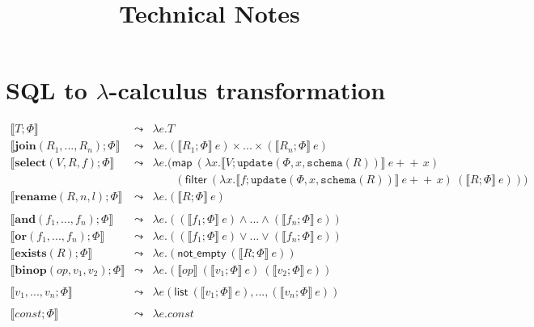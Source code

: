 \documentclass{article}
\newcommand{\concat}{\ensuremath{\!+\!\!\!\!+\!\,}}
\begin{document}
\title{Technical Notes}
\author{}
\date{}
\maketitle

\section*{SQL to $\lambda$-calculus transformation}


\[
\begin{array}{rcl}
 \llbracket T; \Phi  \rrbracket& \leadsto& \lambda e.T\\
\llbracket \mathbf{join}(R_1,...,R_n);\Phi \rrbracket &\leadsto& \lambda e.(\llbracket R_1; \Phi\rrbracket~e)\times...\times(\llbracket R_n;\Phi\rrbracket~e)\\
\llbracket \mathbf{select}(V, R, f);\Phi \rrbracket &\leadsto& \lambda e. (\mathsf{map}~(\lambda x.\llbracket V;\mathtt{update}(\Phi, x, \mathtt{schema}(R)) \rrbracket~ e\concat x)\\
& & \qquad(\mathsf{filter}~(\lambda x.\llbracket f; \mathtt{update}(\Phi, x,\mathtt{schema}(R))\rrbracket~e\concat x)~ (\llbracket R;\Phi \rrbracket~e)))\\
\llbracket \mathbf{rename}(R, n, l);\Phi \rrbracket &\leadsto& \lambda e.(\llbracket R; \Phi\rrbracket~e)\\
\\
 \llbracket \mathbf{and}(f_1,...,f_n);\Phi \rrbracket &\leadsto& \lambda e.((\llbracket f_1;\Phi \rrbracket~e) \land ... \land (\llbracket f_n;\Phi \rrbracket~e))\\
\llbracket \mathbf{or}(f_1,...,f_n);\Phi \rrbracket &\leadsto& \lambda e.((\llbracket f_1;\Phi \rrbracket~e) \lor ... \lor (\llbracket f_n;\Phi \rrbracket~e))\\
\llbracket\mathbf{exists}(R);\Phi \rrbracket &\leadsto& \lambda e. (\mathsf{not\_empty}~(\llbracket R;\Phi \rrbracket~e))\\
\llbracket \mathbf{binop}(\mathit{op}, v_1, v_2);\Phi\rrbracket &\leadsto&  \lambda e.(\llbracket \mathit{op} \rrbracket~(\llbracket v_1;\Phi \rrbracket~e)~(\llbracket v_2;\Phi \rrbracket~e))\\
\\
 \llbracket v_1,...,v_n;\Phi \rrbracket & \leadsto &\lambda e(\mathsf{list}~(\llbracket v_1;\Phi\rrbracket~e),...,(\llbracket v_n;\Phi\rrbracket~e)) \\
 \\
\llbracket \mathit{const};\Phi \rrbracket & \leadsto & \lambda e.\mathit{const}\\

\end{array}\]
\end{document}
